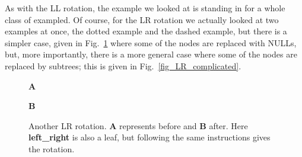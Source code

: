 \documentclass[11pt,a4paper]{scrartcl}
\begin{document}
As with the LL rotation, the example we looked at is standing in for a
whole class of exampled. Of course, for the LR rotation we actually
looked at two examples at once, the dotted example and the dashed
example, but there is a simpler case, given in
Fig.~\ref{fig_LR_simple} where some of the nodes are replaced with
NULLs, but, more importantly, there is a more general case where some
of the nodes are replaced by subtrees; this is given in
Fig.~\ref{fig_LR_complicated}.


\begin{figure}
{\bf A}
\begin{center}
\end{center}
{\bf B}
\begin{center}
\end{center}
\caption{Another LR rotation. {\bf A} represents before and {\bf B}
  after. Here {\bf left\_right} is also a leaf, but following the same
  instructions gives the rotation.\label{fig_LR_simple}}
\end{figure}
\end{document}
